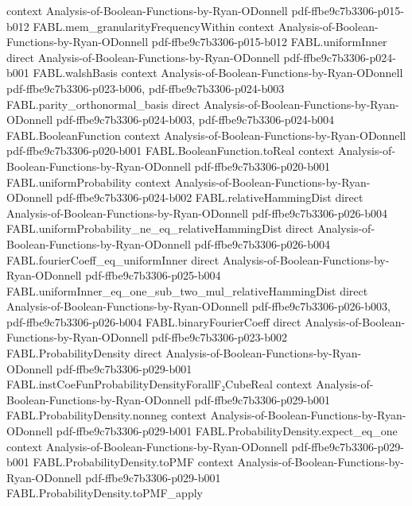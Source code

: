 \begin{theorem}
  {context}
  {Analysis-of-Boolean-Functions-by-Ryan-ODonnell}
  {pdf-ffbe9c7b3306-p015-b012}
\proofstep
  {FABL.mem_granularityFrequencyWithin}
  {context}
  {Analysis-of-Boolean-Functions-by-Ryan-ODonnell}
  {pdf-ffbe9c7b3306-p015-b012}
\proofstep
  {FABL.uniformInner}
  {direct}
  {Analysis-of-Boolean-Functions-by-Ryan-ODonnell}
  {pdf-ffbe9c7b3306-p024-b001}
\proofstep
  {FABL.walshBasis}
  {context}
  {Analysis-of-Boolean-Functions-by-Ryan-ODonnell}
  {pdf-ffbe9c7b3306-p023-b006,
    pdf-ffbe9c7b3306-p024-b003}
\proofstep
  {FABL.parity_orthonormal_basis}
  {direct}
  {Analysis-of-Boolean-Functions-by-Ryan-ODonnell}
  {pdf-ffbe9c7b3306-p024-b003,
    pdf-ffbe9c7b3306-p024-b004}
\proofstep
  {FABL.BooleanFunction}
  {context}
  {Analysis-of-Boolean-Functions-by-Ryan-ODonnell}
  {pdf-ffbe9c7b3306-p020-b001}
\proofstep
  {FABL.BooleanFunction.toReal}
  {context}
  {Analysis-of-Boolean-Functions-by-Ryan-ODonnell}
  {pdf-ffbe9c7b3306-p020-b001}
\proofstep
  {FABL.uniformProbability}
  {context}
  {Analysis-of-Boolean-Functions-by-Ryan-ODonnell}
  {pdf-ffbe9c7b3306-p024-b002}
\proofstep
  {FABL.relativeHammingDist}
  {direct}
  {Analysis-of-Boolean-Functions-by-Ryan-ODonnell}
  {pdf-ffbe9c7b3306-p026-b004}
\proofstep
  {FABL.uniformProbability_ne_eq_relativeHammingDist}
  {direct}
  {Analysis-of-Boolean-Functions-by-Ryan-ODonnell}
  {pdf-ffbe9c7b3306-p026-b004}
\proofstep
  {FABL.fourierCoeff_eq_uniformInner}
  {direct}
  {Analysis-of-Boolean-Functions-by-Ryan-ODonnell}
  {pdf-ffbe9c7b3306-p025-b004}
\proofstep
  {FABL.uniformInner_eq_one_sub_two_mul_relativeHammingDist}
  {direct}
  {Analysis-of-Boolean-Functions-by-Ryan-ODonnell}
  {pdf-ffbe9c7b3306-p026-b003,
    pdf-ffbe9c7b3306-p026-b004}
\proofstep
  {FABL.binaryFourierCoeff}
  {direct}
  {Analysis-of-Boolean-Functions-by-Ryan-ODonnell}
  {pdf-ffbe9c7b3306-p023-b002}
\proofstep
  {FABL.ProbabilityDensity}
  {direct}
  {Analysis-of-Boolean-Functions-by-Ryan-ODonnell}
  {pdf-ffbe9c7b3306-p029-b001}
\proofstep
  {FABL.instCoeFunProbabilityDensityForallF₂CubeReal}
  {context}
  {Analysis-of-Boolean-Functions-by-Ryan-ODonnell}
  {pdf-ffbe9c7b3306-p029-b001}
\proofstep
  {FABL.ProbabilityDensity.nonneg}
  {context}
  {Analysis-of-Boolean-Functions-by-Ryan-ODonnell}
  {pdf-ffbe9c7b3306-p029-b001}
\proofstep
  {FABL.ProbabilityDensity.expect_eq_one}
  {context}
  {Analysis-of-Boolean-Functions-by-Ryan-ODonnell}
  {pdf-ffbe9c7b3306-p029-b001}
\proofstep
  {FABL.ProbabilityDensity.toPMF}
  {context}
  {Analysis-of-Boolean-Functions-by-Ryan-ODonnell}
  {pdf-ffbe9c7b3306-p029-b001}
\proofstep
  {FABL.ProbabilityDensity.toPMF_apply}

\end{theorem}
